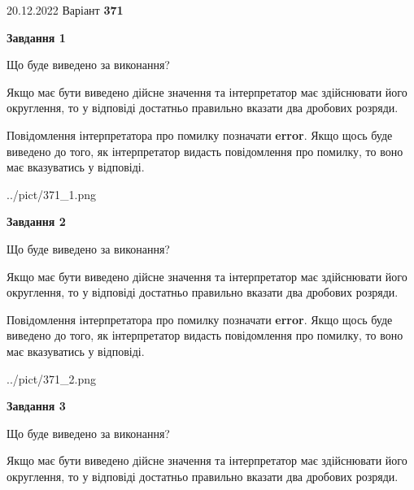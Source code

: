 \documentclass[12pt, ukrainian]{article}
\begin{document}
{20.12.2022 Варіант \No \textbf { 371 }\par}
{
\begin {Large}

{\begin {center}\textbf{Завдання 1}\end {center}}\par
Що буде виведено за виконання? \par

Якщо має бути виведено дійсне значення та інтерпретатор має здійснювати його округлення, 
то у відповіді достатньо правильно вказати два дробових розряди.

Повідомлення інтерпретатора про помилку позначати \textbf{error}.
Якщо щось буде виведено до того, як інтерпретатор видасть повідомлення про помилку, 
то воно має вказуватись у відповіді. \par

\begin{center}
	{../pict/371_1.png}
\end{center}
\newpage

{\begin {center}\textbf{Завдання 2}\end {center}}\par
Що буде виведено за виконання? \par

Якщо має бути виведено дійсне значення та інтерпретатор має здійснювати його округлення, 
то у відповіді достатньо правильно вказати два дробових розряди.

Повідомлення інтерпретатора про помилку позначати \textbf{error}.
Якщо щось буде виведено до того, як інтерпретатор видасть повідомлення про помилку, 
то воно має вказуватись у відповіді. \par

\begin{center}
	{../pict/371_2.png}
\end{center}
\newpage

{\begin {center}\textbf{Завдання 3}\end {center}}\par
Що буде виведено за виконання? \par

Якщо має бути виведено дійсне значення та інтерпретатор має здійснювати його округлення, 
то у відповіді достатньо правильно вказати два дробових розряди.


\end{Large}}
\end{document}
